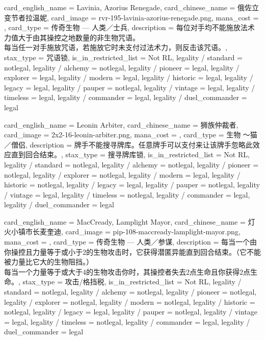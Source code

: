 \documentclass[lang = cn, color = black, 10pt]{AllThatStax}
\begin{document}
\card
{
	card_english_name = {Lavinia, Azorius Renegade},
	card_chinese_name = {俄佐立变节者拉温妮},
	card_image = rvr-195-lavinia-azorius-renegade.png,
	mana_cost = ,
	card_type = 传奇生物 — 人类／士兵,
	description = {每位对手均不能施放法术力值大于由其操控之地数量的非生物咒语。\\
		每当任一对手施放咒语，若施放它时未支付过法术力，则反击该咒语。},
	stax_type = 咒语锁,
	is_in_restricted_list = Not RL,
	legality / standard = notlegal,
	legality / alchemy = notlegal,
	legality / pioneer = legal,
	legality / explorer = legal,
	legality / modern = legal,
	legality / historic = legal,
	legality / legacy = legal,
	legality / pauper = notlegal,
	legality / vintage = legal,
	legality / timeless = legal,
	legality / commander = legal,
	legality / duel_commander = legal
}

\card
{
	card_english_name = {Leonin Arbiter},
	card_chinese_name = {狮族仲裁者},
	card_image = 2x2-16-leonin-arbiter.png,
	mana_cost = ,
	card_type = 生物 ～猫／僧侣,
	description = {牌手不能搜寻牌库。任意牌手可以支付来让该牌手忽略此效应直到回合结束。},
	stax_type = 搜寻牌库锁,
	is_in_restricted_list = Not RL,
	legality / standard = notlegal,
	legality / alchemy = notlegal,
	legality / pioneer = notlegal,
	legality / explorer = notlegal,
	legality / modern = legal,
	legality / historic = notlegal,
	legality / legacy = legal,
	legality / pauper = notlegal,
	legality / vintage = legal,
	legality / timeless = notlegal,
	legality / commander = legal,
	legality / duel_commander = legal
}

\card
{
	card_english_name = {MacCready, Lamplight Mayor},
	card_chinese_name = {灯火小镇市长麦奎迪},
	card_image = pip-108-maccready-lamplight-mayor.png,
	mana_cost = ,
	card_type = 传奇生物 — 人类／参谋,
	description = {每当一个由你操控且力量等于或小于2的生物攻击时，它获得潜匿异能直到回合结束。（它不能被力量比它大的生物阻挡。）\\
		每当一个力量等于或大于4的生物攻击你时，其操控者失去2点生命且你获得2点生命。},
	stax_type = 攻击/格挡税,
	is_in_restricted_list = Not RL,
	legality / standard = notlegal,
	legality / alchemy = notlegal,
	legality / pioneer = notlegal,
	legality / explorer = notlegal,
	legality / modern = notlegal,
	legality / historic = notlegal,
	legality / legacy = legal,
	legality / pauper = notlegal,
	legality / vintage = legal,
	legality / timeless = notlegal,
	legality / commander = legal,
	legality / duel_commander = legal
}
\end{document}
